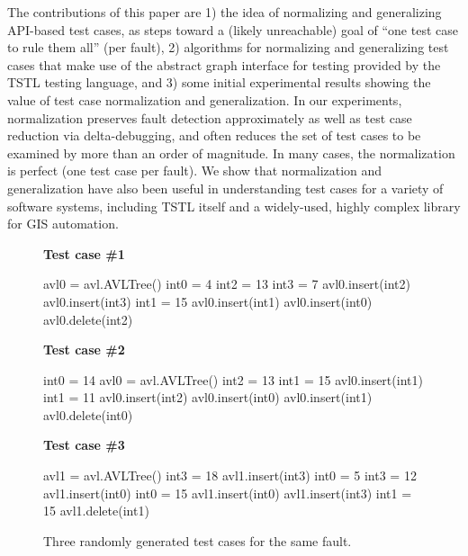 The contributions of this paper are 1) the idea of normalizing and
generalizing API-based test cases, as steps toward a (likely
unreachable) goal of ``one test case to rule them all'' (per fault),
2) algorithms for normalizing and generalizing test cases that make
use of the abstract graph interface for testing provided by the TSTL
\cite{tstl,NFM15,ISSTA15} testing language, and 3) some initial
experimental results showing the value of test case normalization and
generalization.  In our experiments, normalization preserves fault
detection approximately as well as test case reduction via
delta-debugging, and often reduces the set of test cases to be
examined by more than an order of magnitude. In many cases, the
normalization is perfect (one test case per fault).  We show that
normalization and generalization have also been useful in
understanding test cases for a variety of software systems, including
TSTL itself and a widely-used, highly complex library for GIS
automation.

\begin{figure}
{\scriptsize
{\bf Test case \#1}
\begin{code}
avl0 = avl.AVLTree() 
int0 = 4 
int2 = 13 
int3 = 7 
avl0.insert(int2) 
avl0.insert(int3) 
int1 = 15 
avl0.insert(int1) 
avl0.insert(int0) 
avl0.delete(int2)
\end{code}
{\bf Test case \#2}
\begin{code}
int0 = 14 
avl0 = avl.AVLTree() 
int2 = 13 
int1 = 15 
avl0.insert(int1) 
int1 = 11 
avl0.insert(int2) 
avl0.insert(int0) 
avl0.insert(int1) 
avl0.delete(int0) 
\end{code}
{\bf Test case \#3}
\begin{code}
avl1 = avl.AVLTree() 
int3 = 18 
avl1.insert(int3) 
int0 = 5 
int3 = 12 
avl1.insert(int0) 
int0 = 15 
avl1.insert(int0) 
avl1.insert(int3) 
int1 = 15 
avl1.delete(int1) 
\end{code}
}
\caption {Three randomly generated test cases for the same fault.}
\label{threetests}
\end{figure}

